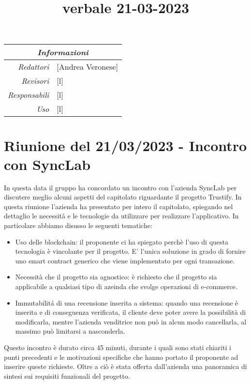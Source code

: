 \documentclass[12pt]{article}
\begin{document}
\graphicspath{ {../templates/img/} }

\title{verbale 21-03-2023}

\firstPage

\maketitle
\begin{center}
    \begin{tabular}{r | l}
		\multicolumn{2}{c}{\textit{Informazioni}}\\
		\hline
		
			\textit{Redattori} &
			[Andrea Veronese]\makecell{}\\
		
			\textit{Revisori} &
			[l]\makecell{}\\
			\textit{Responsabili} &
			[l]\makecell{}\\
		      \textit{Uso} & 
                [l]\makecell{}\\
\end{tabular}
\end{center}


\tableofcontents
\printindex 
\section{Riunione del 21/03/2023 - Incontro con SyncLab}
In questa data il gruppo ha concordato un incontro con l'azienda SyncLab per discutere meglio alcuni aspetti del capitolato riguardante il progetto Trustify.
In questa riunione l'azienda ha presentato per intero il capitolato, spiegando nel dettaglio le necessità e le tecnologie da utilizzare per realizzare l'applicativo.
In particolare abbiamo disusso le seguenti tematiche:
\begin{itemize}
    \item Uso delle blockchain: il proponente ci ha spiegato perchè l'uso di questa tecnologia è vincolante per il progetto. E' l'unica soluzione in grado di fornire uno smart contract generico che viene implementato per ogni transazione.
    \item Necessità che il progetto sia agnostico: è richiesto che il progetto sia applicabile a qualsiasi tipo di azeinda che svolge operazioni di e-commerce.
    \item Immutabilit\'{a} di una recensione inserita a sistema: quando una recensione è inserita e di conseguenza verificata, il cliente deve poter avere la possibilità di modificarla, mentre l'azienda venditrice non può in alcun modo cancellarla, al massimo può limitarsi a nasconderla.
\end{itemize}
Questo incontro è durato circa 45 minuti, durante i quali sono stati chiariti i punti precedenti e le motivazioni specifiche che hanno portato il proponente ad inserire queste richieste. Oltre a ciò è stata offerta dall'azienda una panoramica di sintesi sui requisiti funzionali del progetto.
\end{document}
